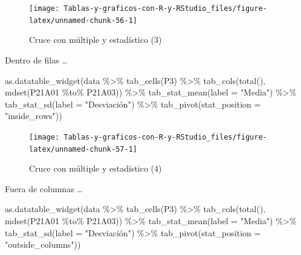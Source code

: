 \documentclass[
]{book}
\newenvironment{Shaded}{\begin{snugshade}}{\end{snugshade}}
\newcommand{\AttributeTok}[1]{\textcolor[rgb]{0.77,0.63,0.00}{#1}}
\newcommand{\FunctionTok}[1]{\textcolor[rgb]{0.00,0.00,0.00}{#1}}
\newcommand{\NormalTok}[1]{#1}
\newcommand{\SpecialCharTok}[1]{\textcolor[rgb]{0.00,0.00,0.00}{#1}}
\newcommand{\StringTok}[1]{\textcolor[rgb]{0.31,0.60,0.02}{#1}}
\begin{document}
\begin{figure}[H]

{\centering \texttt{[image: Tablas-y-graficos-con-R-y-RStudio\_files/figure-latex/unnamed-chunk-56-1]} 

}

\caption{Cruce con múltiple y estadístico (3)}\label{fig:unnamed-chunk-56}
\end{figure}

Dentro de filas \ldots{}

\begin{Shaded}
\begin{Highlighting}[]
\FunctionTok{as.datatable\_widget}\NormalTok{(data }\SpecialCharTok{\%\textgreater{}\%}
  \FunctionTok{tab\_cells}\NormalTok{(P3) }\SpecialCharTok{\%\textgreater{}\%}
  \FunctionTok{tab\_cols}\NormalTok{(}\FunctionTok{total}\NormalTok{(), }\FunctionTok{mdset}\NormalTok{(P21A01 }\SpecialCharTok{\%to\%}\NormalTok{ P21A03)) }\SpecialCharTok{\%\textgreater{}\%}
  \FunctionTok{tab\_stat\_mean}\NormalTok{(}\AttributeTok{label =} \StringTok{"Media"}\NormalTok{) }\SpecialCharTok{\%\textgreater{}\%}
  \FunctionTok{tab\_stat\_sd}\NormalTok{(}\AttributeTok{label =} \StringTok{"Desviación"}\NormalTok{) }\SpecialCharTok{\%\textgreater{}\%}
  \FunctionTok{tab\_pivot}\NormalTok{(}\AttributeTok{stat\_position =} \StringTok{"inside\_rows"}\NormalTok{))}
\end{Highlighting}
\end{Shaded}

\begin{figure}[H]

{\centering \texttt{[image: Tablas-y-graficos-con-R-y-RStudio\_files/figure-latex/unnamed-chunk-57-1]} 

}

\caption{Cruce con múltiple y estadístico (4)}\label{fig:unnamed-chunk-57}
\end{figure}

Fuera de columnas \ldots{}

\begin{Shaded}
\begin{Highlighting}[]
\FunctionTok{as.datatable\_widget}\NormalTok{(data }\SpecialCharTok{\%\textgreater{}\%}
  \FunctionTok{tab\_cells}\NormalTok{(P3) }\SpecialCharTok{\%\textgreater{}\%}
  \FunctionTok{tab\_cols}\NormalTok{(}\FunctionTok{total}\NormalTok{(), }\FunctionTok{mdset}\NormalTok{(P21A01 }\SpecialCharTok{\%to\%}\NormalTok{ P21A03)) }\SpecialCharTok{\%\textgreater{}\%}
  \FunctionTok{tab\_stat\_mean}\NormalTok{(}\AttributeTok{label =} \StringTok{"Media"}\NormalTok{) }\SpecialCharTok{\%\textgreater{}\%}
  \FunctionTok{tab\_stat\_sd}\NormalTok{(}\AttributeTok{label =} \StringTok{"Desviación"}\NormalTok{) }\SpecialCharTok{\%\textgreater{}\%}
  \FunctionTok{tab\_pivot}\NormalTok{(}\AttributeTok{stat\_position =} \StringTok{"outside\_columns"}\NormalTok{))}
\end{Highlighting}
\end{Shaded}
\end{document}
